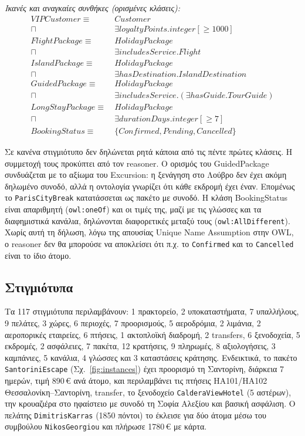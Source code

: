 \documentclass[conference]{IEEEtran}
\newcommand{\cls}[1]{\textsf{#1}}          %
\newcommand{\ind}[1]{\texttt{#1}}          %
\begin{document}
\noindent\textit{Ικανές και αναγκαίες συνθήκες (ορισμένες κλάσεις):}
{\footnotesize
\begin{align*}
\mathit{VIPCustomer} \equiv\ & \mathit{Customer}\\
 \sqcap\ & \exists\mathit{loyaltyPoints}.\mathit{integer}[\geq 1000]\\
\mathit{FlightPackage} \equiv\ & \mathit{HolidayPackage}\\
 \sqcap\ & \exists\mathit{includesService}.\mathit{Flight}\\
\mathit{IslandPackage} \equiv\ & \mathit{HolidayPackage}\\
 \sqcap\ & \exists\mathit{hasDestination}.\mathit{IslandDestination}\\
\mathit{GuidedPackage} \equiv\ & \mathit{HolidayPackage}\\
 \sqcap\ & \exists\mathit{includesService}.(\exists\mathit{hasGuide}.\mathit{TourGuide})\\
\mathit{LongStayPackage} \equiv\ & \mathit{HolidayPackage}\\
 \sqcap\ & \exists\mathit{durationDays}.\mathit{integer}[\geq 7]\\
\mathit{BookingStatus} \equiv\ & \{\mathit{Confirmed}, \mathit{Pending}, \mathit{Cancelled}\}
\end{align*}}

Σε κανένα στιγμιότυπο δεν δηλώνεται ρητά κάποια από τις πέντε πρώτες κλάσεις.
Η συμμετοχή τους προκύπτει από τον reasoner. Ο ορισμός του \cls{GuidedPackage}
συνδυάζεται με το αξίωμα του \cls{Excursion}: η ξενάγηση στο Λούβρο δεν έχει
ακόμη δηλωμένο συνοδό, αλλά η οντολογία γνωρίζει ότι κάθε εκδρομή έχει έναν.
Επομένως το \ind{ParisCityBreak} κατατάσσεται ως πακέτο με συνοδό. Η κλάση
\cls{BookingStatus} είναι απαριθμητή (\texttt{owl:oneOf}) και οι τιμές της, μαζί με
τις γλώσσες και τα διαφημιστικά κανάλια, δηλώνονται διαφορετικές μεταξύ τους
(\texttt{owl:AllDifferent}). Χωρίς αυτή τη δήλωση, λόγω της απουσίας Unique Name
Assumption στην OWL, ο reasoner δεν θα μπορούσε να αποκλείσει ότι π.χ. το
\ind{Confirmed} και το \ind{Cancelled} είναι το ίδιο άτομο.

\subsection{Στιγμιότυπα}

Τα 117 στιγμιότυπα περιλαμβάνουν: 1 πρακτορείο, 2 υποκαταστήματα, 7 υπαλλήλους,
9 πελάτες, 3 χώρες, 6 περιοχές, 7 προορισμούς, 5 αεροδρόμια, 2 λιμάνια,
2 αεροπορικές εταιρείες, 6 πτήσεις, 1 ακτοπλοϊκή διαδρομή, 2 transfers,
6 ξενοδοχεία, 5 εκδρομές, 2 ασφάλειες, 7 πακέτα, 12 κρατήσεις, 9 πληρωμές,
8 αξιολογήσεις, 3 καμπάνιες, 5 κανάλια, 4 γλώσσες και 3 καταστάσεις κράτησης.
Ενδεικτικά, το πακέτο \ind{SantoriniEscape} (Σχ.~\ref{fig:instances}) έχει
προορισμό τη Σαντορίνη, διάρκεια 7 ημερών, τιμή 890\,€ ανά άτομο, και
περιλαμβάνει τις πτήσεις HA101/HA102 Θεσσαλονίκη--Σαντορίνη, transfer, το
ξενοδοχείο \ind{CalderaViewHotel} (5 αστέρων), την κρουαζιέρα στο ηφαίστειο με
συνοδό τη Σοφία Αλεξίου και βασική ασφάλιση. Ο πελάτης \ind{DimitrisKarras} (1850
πόντοι) το έκλεισε για δύο άτομα μέσω του συμβούλου \ind{NikosGeorgiou} και
πλήρωσε 1780\,€ με κάρτα.
\end{document}
